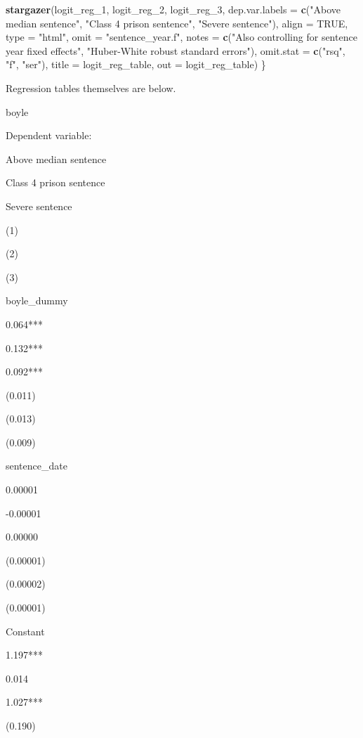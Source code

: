\documentclass[
]{article}
\newenvironment{Shaded}{\begin{snugshade}}{\end{snugshade}}
\newcommand{\DataTypeTok}[1]{\textcolor[rgb]{0.13,0.29,0.53}{#1}}
\newcommand{\DecValTok}[1]{\textcolor[rgb]{0.00,0.00,0.81}{#1}}
\newcommand{\KeywordTok}[1]{\textcolor[rgb]{0.13,0.29,0.53}{\textbf{#1}}}
\newcommand{\NormalTok}[1]{#1}
\newcommand{\OtherTok}[1]{\textcolor[rgb]{0.56,0.35,0.01}{#1}}
\newcommand{\StringTok}[1]{\textcolor[rgb]{0.31,0.60,0.02}{#1}}
\begin{document}
\begin{Shaded}
\begin{Highlighting}[]
    \KeywordTok{stargazer}\NormalTok{(logit_reg_}\DecValTok{1}\NormalTok{, logit_reg_}\DecValTok{2}\NormalTok{, logit_reg_}\DecValTok{3}\NormalTok{, }\DataTypeTok{dep.var.labels =} \KeywordTok{c}\NormalTok{(}\StringTok{"Above median sentence"}\NormalTok{, }
        \StringTok{"Class 4 prison sentence"}\NormalTok{, }\StringTok{"Severe sentence"}\NormalTok{), }\DataTypeTok{align =} \OtherTok{TRUE}\NormalTok{, }\DataTypeTok{type =} \StringTok{"html"}\NormalTok{, }
        \DataTypeTok{omit =} \StringTok{"sentence_year.f"}\NormalTok{, }\DataTypeTok{notes =} \KeywordTok{c}\NormalTok{(}\StringTok{"Also controlling for sentence year fixed effects"}\NormalTok{, }
            \StringTok{"Huber-White robust standard errors"}\NormalTok{), }\DataTypeTok{omit.stat =} \KeywordTok{c}\NormalTok{(}\StringTok{"rsq"}\NormalTok{, }\StringTok{"f"}\NormalTok{, }\StringTok{"ser"}\NormalTok{), }
        \DataTypeTok{title =}\NormalTok{ logit_reg_table, }\DataTypeTok{out =}\NormalTok{ logit_reg_table)}
\NormalTok{\}}
\end{Highlighting}
\end{Shaded}

Regression tables themselves are below.

boyle

Dependent variable:

Above median sentence

Class 4 prison sentence

Severe sentence

(1)

(2)

(3)

boyle\_dummy

0.064***

0.132***

0.092***

(0.011)

(0.013)

(0.009)

sentence\_date

0.00001

-0.00001

0.00000

(0.00001)

(0.00002)

(0.00001)

Constant

1.197***

0.014

1.027***

(0.190)
\end{document}

